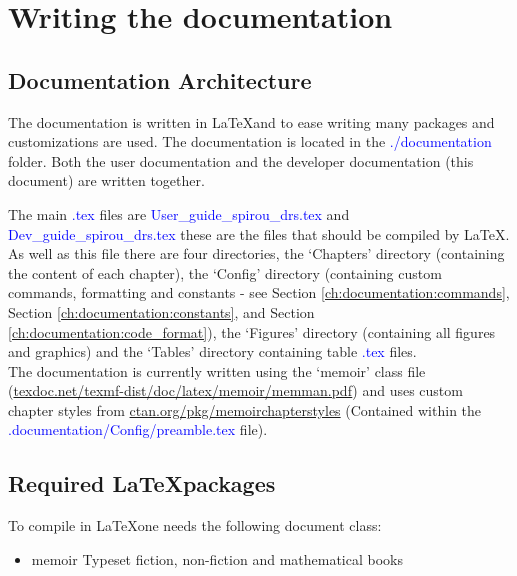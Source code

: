 \chapter{Writing the documentation}
\label{ch:documentation}

\section{Documentation Architecture}
\label{ch:documentation:architecture}

The documentation is written in \LaTeX and to ease writing many packages and customizations are used. The documentation is located in the \textcolor{blue}{./documentation} folder. Both the user documentation and the developer documentation (this document) are written together. 

The main \textcolor{blue}{.tex} files are \textcolor{blue}{User\_guide\_spirou\_drs.tex} and \textcolor{blue}{Dev\_guide\_spirou\_drs.tex} these are the files that should be compiled by \LaTeX. As well as this file there are four directories, the `Chapters' directory (containing the content of each chapter), the `Config' directory (containing custom commands, formatting and constants - see Section \ref{ch:documentation:commands}, Section \ref{ch:documentation:constants}, and Section \ref{ch:documentation:code_format}), the `Figures' directory (containing all figures and graphics) and the `Tables' directory containing table \textcolor{blue}{.tex} files. \\

\noindent The documentation is currently written using the `memoir' class file (\url{texdoc.net/texmf-dist/doc/latex/memoir/memman.pdf}) and uses custom chapter styles from \url{ctan.org/pkg/memoirchapterstyles} (Contained within the \textcolor{blue}{.documentation/Config/preamble.tex} file). 

\section{Required \LaTeX packages}
\label{ch:documentation:packages}

To compile in \LaTeX one needs the following document class:
\begin{itemize}
	\item memoir \dotfill Typeset fiction, non-fiction and mathematical books
\end{itemize}

